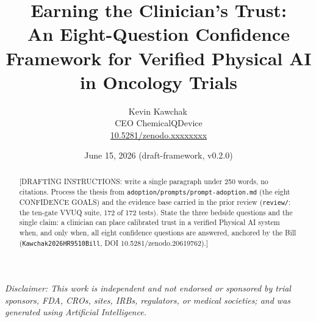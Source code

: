 \documentclass[11pt]{article}
\title{Earning the Clinician's Trust:\\ An Eight-Question Confidence Framework for Verified Physical AI in Oncology Trials}
\author{Kevin Kawchak\,\orcidicon{0009-0007-5457-8667}\\ CEO ChemicalQDevice\\ \href{https://doi.org/10.5281/zenodo.xxxxxxxx}{10.5281/zenodo.xxxxxxxx}}
\date{June 15, 2026 \quad (draft-framework, v0.2.0)}
\begin{document}
\maketitle
\thispagestyle{empty}

\begin{abstract}
[DRAFTING INSTRUCTIONS: write a single paragraph under 250 words, no citations.
Process the thesis from \texttt{adoption/prompts/prompt-adoption.md} (the eight
CONFIDENCE GOALS) and the evidence base carried in the prior review
(\texttt{review/}: the ten-gate VVUQ suite, 172 of 172 tests). State the three
bedside questions and the single claim: a clinician can place calibrated trust in
a verified Physical AI system when, and only when, all eight confidence questions
are answered, anchored by the Bill (\texttt{Kawchak2026HR9510Bill},
DOI 10.5281/zenodo.20619762).]
\end{abstract}

\vspace{0.2em}\noindent\footnotesize\textit{Disclaimer: This work is independent
and not endorsed or sponsored by trial sponsors, FDA, CROs, sites, IRBs,
regulators, or medical societies; and was generated using Artificial
Intelligence.}\normalsize\par




\tableofcontents
\vspace{0.3cm}










\clearpage
{}
\begingroup\raggedright\nocite{*}\endgroup


\end{document}

